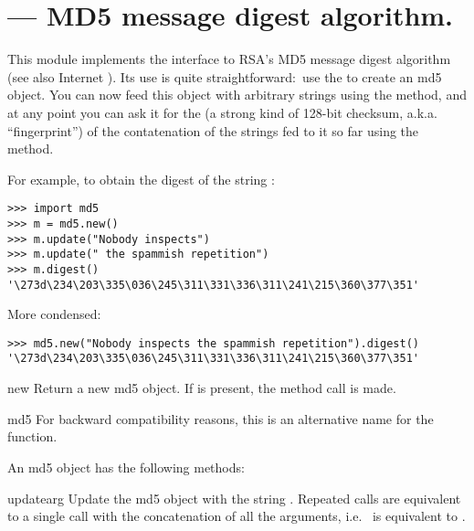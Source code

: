 \section{ ---
         MD5 message digest algorithm.}



This module implements the interface to RSA's MD5 message digest
algorithm (see also Internet ).  Its use is quite
straightforward:\ use the  to create an md5 object.
You can now feed this object with arbitrary strings using the
 method, and at any point you can ask it for the
 (a strong kind of 128-bit checksum,
a.k.a. ``fingerprint'') of the contatenation of the strings fed to it
so far using the  method.

For example, to obtain the digest of the string :

\begin{verbatim}
>>> import md5
>>> m = md5.new()
>>> m.update("Nobody inspects")
>>> m.update(" the spammish repetition")
>>> m.digest()
'\273d\234\203\335\036\245\311\331\336\311\241\215\360\377\351'
\end{verbatim}

More condensed:

\begin{verbatim}
>>> md5.new("Nobody inspects the spammish repetition").digest()
'\273d\234\203\335\036\245\311\331\336\311\241\215\360\377\351'
\end{verbatim}

\begin{funcdesc}{new}{}
Return a new md5 object.  If  is present, the method call
 is made.
\end{funcdesc}

\begin{funcdesc}{md5}{}
For backward compatibility reasons, this is an alternative name for the
 function.
\end{funcdesc}

An md5 object has the following methods:

\begin{methoddesc}[md5]{update}{arg}
Update the md5 object with the string .  Repeated calls are
equivalent to a single call with the concatenation of all the
arguments, i.e.\  is equivalent to
.
\end{methoddesc}

